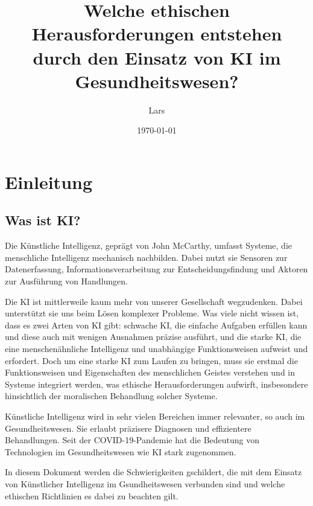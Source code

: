 \documentclass{article}
\title{Welche ethischen Herausforderungen entstehen durch den Einsatz von KI im Gesundheitswesen?}
\author{Lars}
\date{\today}
\begin{document}
\maketitle


\tableofcontents

\chapter{Einleitung}

\section{Was ist KI?}
Die Künstliche Intelligenz, geprägt von John McCarthy, umfasst Systeme, die menschliche Intelligenz mechanisch nachbilden. Dabei nutzt sie Sensoren zur Datenerfassung, Informationsverarbeitung zur Entscheidungsfindung und Aktoren zur Ausführung von Handlungen. 

\vspace{2mm}Die KI ist mittlerweile kaum mehr von unserer Gesellschaft wegzudenken. Dabei unterstützt sie uns beim Lösen komplexer Probleme. Was viele nicht wissen ist, dass es zwei Arten von KI gibt: schwache KI, die einfache Aufgaben erfüllen kann und diese auch mit wenigen Ausnahmen präzise ausführt, und die starke KI, die eine menschenähnliche Intelligenz und unabhängige Funktionsweisen aufweist und erfordert. Doch um eine starke KI zum Laufen zu bringen, muss sie erstmal die Funktionsweisen und Eigenschaften des menschlichen Geistes verstehen und in Systeme integriert werden, was ethische Herausforderungen aufwirft, insbesondere hinsichtlich der moralischen Behandlung solcher Systeme.

\vspace{2mm}Künstliche Intelligenz wird in sehr vielen Bereichen immer relevanter, so auch im Gesundheitswesen. Sie erlaubt präzisere Diagnosen und effizientere Behandlungen. Seit der COVID-19-Pandemie hat die Bedeutung von Technologien im Gesundheitswesen wie KI stark zugenommen.

\vspace{2mm}In diesem Dokument werden die Schwierigkeiten gschildert, die mit dem Einsatz von Künstlicher Intelligenz im Gsundheitswesen verbunden sind und welche ethischen Richtlinien es dabei zu beachten gilt.
\end{document}
